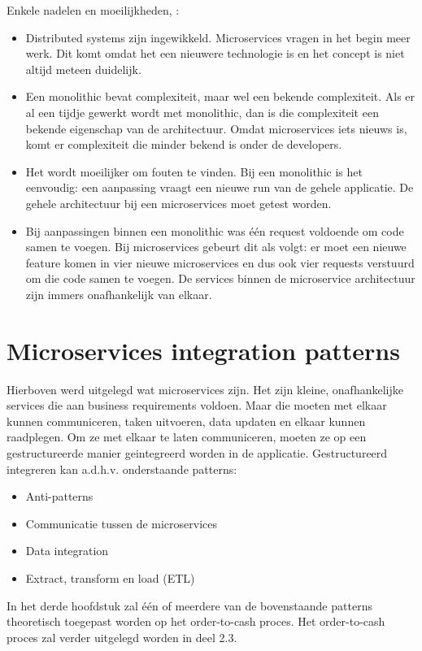 Enkele nadelen en moeilijkheden, \textcite{Koukia2018}:
\begin{itemize}
	\item Distributed systems zijn ingewikkeld. Microservices vragen in het begin meer  werk. Dit komt omdat het een nieuwere technologie is en het concept is niet altijd meteen duidelijk. 
	\item Een monolithic bevat complexiteit, maar  wel een bekende complexiteit. Als er al een tijdje gewerkt wordt met monolithic, dan is die complexiteit een bekende eigenschap van de architectuur. Omdat microservices iets nieuws is, komt er complexiteit die minder bekend is onder de developers.
	\item Het wordt moeilijker om fouten te vinden. Bij een monolithic is het eenvoudig: een aanpassing vraagt een nieuwe run van de gehele applicatie. De gehele architectuur bij een microservices moet getest worden.
	\item Bij aanpassingen binnen een monolithic was één request voldoende om code samen te voegen. Bij microservices gebeurt dit als volgt: er moet een nieuwe feature komen in vier nieuwe microservices en dus ook vier requests verstuurd om die code samen te voegen. De services binnen de microservice architectuur zijn immers onafhankelijk van elkaar.
\end{itemize}

\section{Microservices integration patterns}
Hierboven werd uitgelegd wat microservices zijn. Het zijn kleine, onafhankelijke services die aan business requirements voldoen. Maar die moeten met elkaar kunnen communiceren, taken uitvoeren, data updaten en elkaar kunnen raadplegen. Om ze met elkaar te laten communiceren, moeten ze op een gestructureerde manier geintegreerd worden in de applicatie. Gestructureerd integreren kan a.d.h.v. onderstaande patterns:
\begin{itemize}
	\item Anti-patterns
	\item Communicatie tussen de microservices
	\item Data integration
	\item Extract, transform en load (ETL)	
\end{itemize}

In het derde hoofdstuk zal één of meerdere van de bovenstaande patterns theoretisch toegepast worden op het order-to-cash proces. Het order-to-cash proces zal verder uitgelegd worden in deel 2.3.

